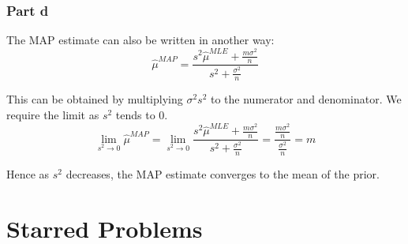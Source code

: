 \documentclass{article}
\begin{document}
\subsubsection*{Part d}
\begin{flushleft}
The MAP estimate can also be written in another way:
\begin{equation}
\hat{\mu}^{MAP} = \frac{s^2\hat{\mu}^{MLE} + \frac{m\sigma^{2}}{n}}{s^{2} + \frac{\sigma^{2}}{n}}
\end{equation}

This can be obtained by multiplying \(\sigma^{2} s^2\) to the numerator and denominator. We require the limit as \(s^{2}\) tends to \(0\).
\begin{equation}
\lim_{s^{2}\to 0} \hat{\mu}^{MAP} = \lim_{s^{2}\to 0} \frac{s^2\hat{\mu}^{MLE} + \frac{m\sigma^{2}}{n}}{s^{2} + \frac{\sigma^{2}}{n}} = \frac{\frac{m\sigma^{2}}{n}}{\frac{\sigma^{2}}{n}} = m
\end{equation}

Hence as \(s^{2}\) decreases, the MAP estimate converges to the mean of the prior.
\end{flushleft}

\section*{Starred Problems}
\end{document}
